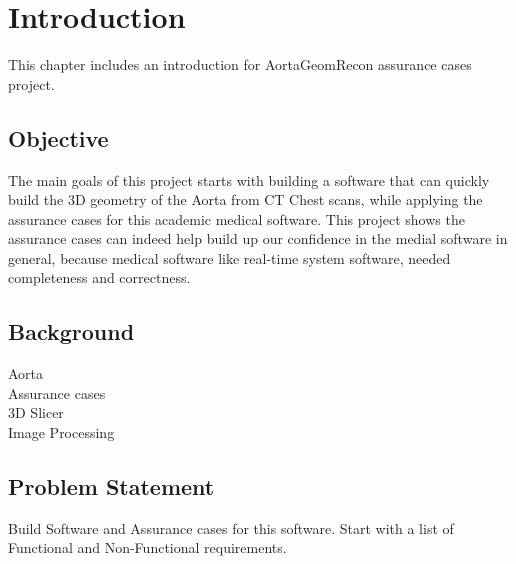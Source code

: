 \chapter{Introduction}
This chapter includes an introduction for AortaGeomRecon assurance cases project. 

%
%

\section{Objective}
The main goals of this project starts with building a software that can quickly build the 3D geometry of the Aorta from CT Chest scans, while applying the assurance cases for this academic medical software. This project shows the assurance cases can indeed help build up our confidence in the medial software in general, because medical software like real-time system software, needed completeness and correctness.


\section{Background}
Aorta  \\
Assurance cases\\
3D Slicer\\
Image Processing\\

\section{Problem Statement}
Build Software and Assurance cases for this software.
Start with a list of Functional and Non-Functional requirements.
